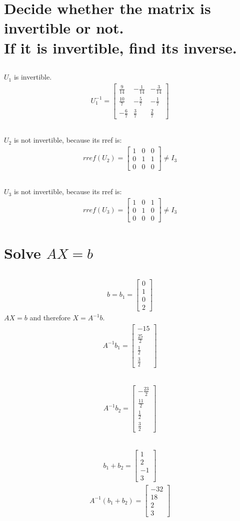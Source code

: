 \documentclass[a4paper, 12pt]{article}
\newcommand{\sub}[1]{\subsection{\underline{#1}}}
\newcommand{\eq}[1]{\begin{align*}#1\end{align*}}
\begin{document}
\section{Decide whether the matrix is invertible or not.\\If it is invertible, find its inverse.}
\sub{}
$U_1$ is invertible.
\eq{
    U_1^{-1}=\begin{bmatrix}
        \frac{9}{14}&-\frac{1}{14}&-\frac{3}{14}\\
        \frac{10}{7}&-\frac{5}{7}&-\frac{1}{7}\\
        -\frac{6}{7}&\frac{3}{7}&\frac{2}{7}
    \end{bmatrix}
}
\sub{}
$U_2$ is not invertible, because its rref is:
\eq{
    rref(U_2)=\begin{bmatrix}
        1&0&0\\
        0&1&1\\
        0&0&0
    \end{bmatrix}
    \neq{I_3}
}
\sub{}
$U_3$ is not invertible, because its rref is:
\eq{
    rref(U_3)=\begin{bmatrix}
        1&0&1\\
        0&1&0\\
        0&0&0
    \end{bmatrix}
    \neq{I_3}
}
\pagebreak

\setcounter{section}{12}
\section{Solve $AX=b$}
\sub{}
\eq{
    b=b_1=\begin{bmatrix}
        0\\1\\0\\2
    \end{bmatrix}
}
$AX=b$ and therefore $X=A^{-1}b$.
\eq{
    A^{-1}b_1=
    \begin{bmatrix}
    -15\\\frac{25}{2}\\\frac{1}{2}\\\frac{3}{2}
    \end{bmatrix}
}
\sub{}
\eq{
    A^{-1}b_2=
    \begin{bmatrix}
    -\frac{23}{2}\\
    \frac{11}{2}\\
    \frac{1}{2}\\
    \frac{3}{2}
    \end{bmatrix}
}
\sub{}
\eq{
    b_1+b_2=
    \begin{bmatrix}
        1\\2\\-1\\3
    \end{bmatrix}
}
\eq{
    A^{-1}(b_1+b_2)=
    \begin{bmatrix}
        -32\\18\\2\\3
    \end{bmatrix}
}
\pagebreak
\end{document}
